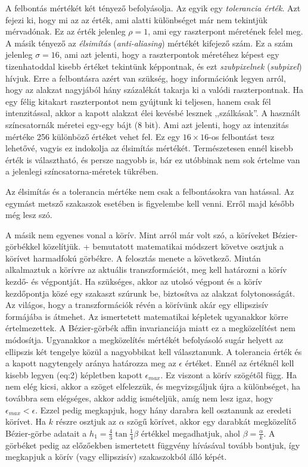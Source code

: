 \documentclass[12pt]{report}
\theoremstyle{definition}
\newcommand{\inenglish}[1]{\textsl{#1}}
\begin{document}
A felbontás mértékét két tényező befolyásolja. Az egyik egy \emph{tolerancia
érték}. Azt fejezi ki, hogy mi az az érték, ami alatti különbséget már nem
tekintjük mérvadónak. Ez az érték jelenleg $\rho=1$, ami egy raszterpont
méretének felel meg. A másik tényező az \emph{élsimítás}
(\inenglish{anti-aliasing}) mértékét kifejező szám. Ez a szám jelenleg
$\sigma=16$, ami azt jelenti, hogy a raszterpontok méretéhez képest egy
tizenhatoddal kisebb értéket tekintünk képpontnak, és ezt \emph{szubpixelnek}
(\inenglish{subpixel}) hívjuk. Erre a felbontásra azért van szükség, hogy
információnk legyen arról, hogy az alakzat nagyjából hány százalékát takarja ki
a valódi raszterpontnak. Ha egy félig kitakart raszterpontot nem gyújtunk ki
teljesen, hanem csak fél intenzitással, akkor a kapott alakzat élei kevésbé
lesznek ,,szálkásak''. A használt színcsatornák méretei egy-egy bájt ($8$ bit).
Ami azt jelenti, hogy az intenzitás mértéke 256 különböző értéket vehet fel. Ez
egy $16\times16$-os felbontást tesz lehetővé, vagyis ez indokolja az élsimítás
mértékét. Természetesen ennél kisebb érték is választható, és persze nagyobb
is, bár ez utóbbinak nem sok értelme van a jelenlegi színcsatorna-méretek
tükrében.

Az élsimítás és a tolerancia mértéke nem csak a felbontásokra van hatással. Az
egymást metsző szakaszok esetében is figyelembe kell venni. Erről majd később
még lesz szó.

A másik nem egyenes vonal a körív. Mint arról már volt szó, a köríveket
Bézier-görbékkel közelítjük. \Az+ bemutatott
matematikai módszert követve osztjuk a körívet harmadfokú görbékre. A
felosztás menete a következő. Miután alkalmaztuk a körívre az aktuális
transzformációt, meg kell határozni a körív kezdő- és végpontját. Ha
szükséges, akkor az utolsó végpont és a körív kezdőpontja közé egy szakaszt
szúrunk be, biztosítva az alakzat folytonosságát. Az világos, hogy a
transzformációk révén a körívünk akár egy ellipszisív formájába is
átmehet. Az ismertetett matematikai képletek ugyanakkor körre értelmezettek. A
Bézier-görbék affin invarianciája miatt ez a megközelítést nem módosítja.
Ugyanakkor a megközelítés mértékét befolyásoló sugár helyett az ellipszis két
tengelye közül a nagyobbikat kell választanunk. A tolerancia érték és a kapott
nagytengely aránya határozza meg az $\epsilon$ értéket. Ennél az értéknél kell
kisebb legyen \aref({eq:2}) képletben kapott $\epsilon_{max}$. Ez viszont a
körív szögétől függ. Ha nem elég kicsi, akkor a szöget elfelezzük, és
megvizsgáljuk újra a különbséget, ha továbbra sem elégséges, akkor addig
ismételjük, amíg nem lesz igaz, hogy $\epsilon_{max} < \epsilon$. Ezzel pedig
megkapjuk, hogy hány darabra kell osztanunk az eredeti körívet. Ha $k$ részre
osztjuk az $\alpha$ szögű körívet, akkor egy darabkát megközelítő
Bézier-görbe adatait a $h_1 = \frac{4}{3} \tan{\frac{1}{4} \beta}$ értékkel
megadhatjuk, ahol $\beta = \frac{\alpha}{k}$. A görbéket pedig az előzőekben
ismertetett függvény hívásával tovább bontjuk, így megkapjuk a körív (vagy
ellipszisív) szakaszokból álló képét.
\end{document}
